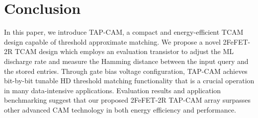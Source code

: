 
\section{Conclusion}
\label{sec:conclusion}


In this paper, we introduce TAP-CAM, a compact and energy-efficient TCAM design capable of threshold approximate matching. 
We propose a novel 2FeFET-2R TCAM design which employs an evaluation transistor  to adjust the ML discharge rate and measure the Hamming distance between the input query and the stored entries. 
Through gate bias voltage configuration, TAP-CAM achieves bit-by-bit tunable HD threshold matching functionality that is a crucial operation in many data-intensive applications. Evaluation results and application benchmarking suggest that our proposed 2FeFET-2R TAP-CAM array surpasses other advanced CAM technology in both energy efficiency and performance.







